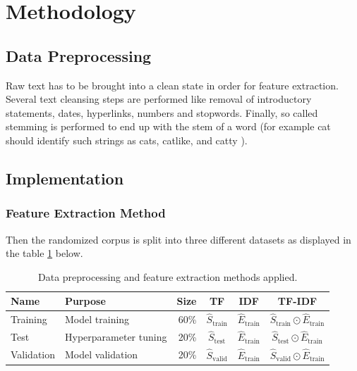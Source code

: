 \documentclass[a4paper,12pt,nottoc]{article}
\begin{document}
\section{Methodology}

\subsection{Data Preprocessing}\label{chap:data-preproc}

Raw text has to be brought into a clean state in order for feature extraction. Several text cleansing steps are performed like removal of introductory statements, dates, hyperlinks, numbers and stopwords. Finally, so called stemming is performed to end up with the stem of a word (for example cat should identify such strings as cats, catlike, and catty \cite{bib:stemming}).

\subsection{Implementation}

\subsubsection{Feature Extraction Method}

Then the randomized corpus is split into three different datasets as displayed in the table \ref{tab:datapreproc} below.

\begin{table}[h]
\begin{center}
\begin{tabular}{| l | l | r | c | c | c |}
\hline
Name & Purpose & Size & TF & IDF & TF-IDF \\
\hline
Training & Model training & 60\% & $\hat{S}_{\textrm{train}}$ & $\hat{E}_{\textrm{train}}$ & $\hat{S}_{\textrm{train}} \odot \hat{E}_{\textrm{train}}$ \\  
Test & Hyperparameter tuning & 20\% & $\hat{S}_{\textrm{test}}$ & $\hat{E}_{\textrm{train}}$ & $\hat{S}_{\textrm{test}} \odot \hat{E}_{\textrm{train}}$ \\    
Validation & Model validation & 20\% & $\hat{S}_{\textrm{valid}}$ & $\hat{E}_{\textrm{train}}$ & $\hat{S}_{\textrm{valid}} \odot \hat{E}_{\textrm{train}}$ \\
\hline 
\end{tabular}
\end{center}
\caption{Data preprocessing and feature extraction methods applied.}\label{tab:datapreproc}
\end{table}
\end{document}
